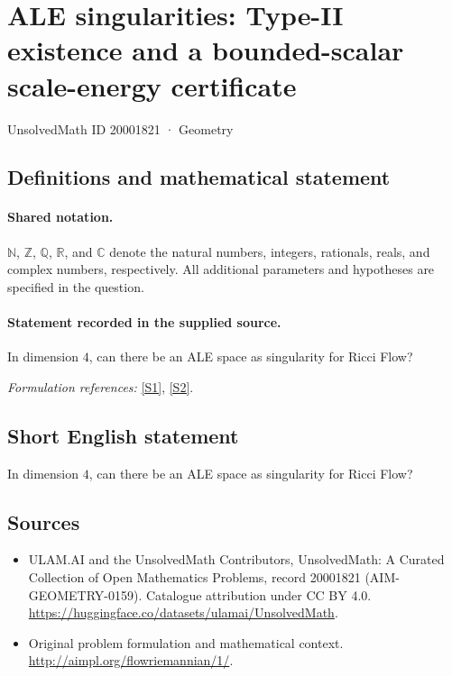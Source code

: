 \documentclass[11pt]{article}
\newcommand{\sref}[2]{\hyperlink{source:#1:#2}{[S#2]}}
\begin{document}
\setcounter{section}{20001820}
\section{ALE singularities: Type-II existence and a bounded-scalar scale-energy certificate}\label{20001821}
{\small UnsolvedMath ID 20001821 · Geometry}
\subsection{Definitions and mathematical statement}

\paragraph{Shared notation.}$\mathbb N$, $\mathbb Z$, $\mathbb Q$, $\mathbb R$, and $\mathbb C$ denote the natural numbers, integers, rationals, reals, and complex numbers, respectively. All additional parameters and hypotheses are specified in the question.


\paragraph{Statement recorded in the supplied source.}
In dimension $4$, can there be an ALE space as singularity for Ricci Flow?
\par\smallskip\textit{Formulation references:} \sref{20001821}{1}, \sref{20001821}{2}.
\subsection{Short English statement}
In dimension $4$, can there be an ALE space as singularity for Ricci Flow?
\subsection{Sources}
\begin{itemize}
\item[\hypertarget{source:20001821:1}{S1}] ULAM.AI and the UnsolvedMath Contributors, UnsolvedMath: A Curated Collection of Open Mathematics Problems, record 20001821 (AIM-GEOMETRY-0159). Catalogue attribution under CC BY 4.0.
\url{https://huggingface.co/datasets/ulamai/UnsolvedMath}.
\item[\hypertarget{source:20001821:2}{S2}] Original problem formulation and mathematical context.
\url{http://aimpl.org/flowriemannian/1/}.
\end{itemize}
\label{end:20001821}
\end{document}

